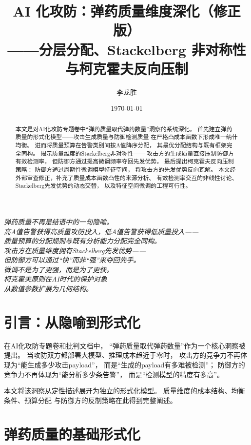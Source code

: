 \documentclass[11pt,a4paper]{article}
\title{AI 化攻防：弹药质量维度深化（修正版）\\
——分层分配、Stackelberg 非对称性与柯克霍夫反向压制}
\author{李龙胜}
\date{\today}
\begin{document}
\maketitle

\begin{center}
\textit{
弹药质量不再是结语中的一句隐喻。\\
高A值告警获得高质量攻防投入，低A值告警获得低质量投入——\\
质量预算的分配规则与既有分析能力分配完全同构。\\
攻击方在质量维度拥有Stackelberg先发优势——\\
但防御方可以通过“快”而非“强”来夺回先手。\\
微调不是为了更强，而是为了更快。\\
柯克霍夫原则在AI时代的保护对象\\
从数值参数扩展为几何结构。
}
\end{center}

\vspace{5mm}

\begin{abstract}
本文是对AI化攻防专题卷中“弹药质量取代弹药数量”洞察的系统深化。
首先建立弹药质量的形式化模型——攻击生成质量与防御检测质量
在严格凸成本函数下形成唯一纳什均衡。
进而将质量预算在告警类别间按A值降序分配，
其最优分配结构与既有框架完全同构。
揭示质量维度的Stackelberg非对称性——
攻击方的生成质量直接压制防御方有效检测率，
但防御方通过提高微调频率夺回先发优势。
最后提出柯克霍夫反向压制策略：
防御方通过周期性微调模型特征空间，
将攻击方的先发优势反向瓦解。
本文经外部审查修正，补充了质量成本函数凸性的来源分析、
有效检测率交互的非线性讨论、Stackelberg先发优势的动态交替，
以及特征空间微调的工程可行性。
\end{abstract}

\tableofcontents

\section{引言：从隐喻到形式化}

在AI化攻防专题卷和批判文档中，
“弹药质量取代弹药数量”作为一个核心洞察被提出。
当攻防双方都部署大模型、推理成本趋近于零时，
攻击方的竞争力不再体现为“能生成多少攻击payload”，
而是“生成的payload有多难被检测”；
防御方的竞争力不再体现为“能分析多少条告警”，
而是“检测模型的精度有多高”。

本文将该洞察从定性描述展开为独立的形式化模型。
质量维度的成本结构、均衡条件、预算分配
与防御方的反制策略在此得到完整阐述。

\section{弹药质量的基础形式化}
\end{document}
